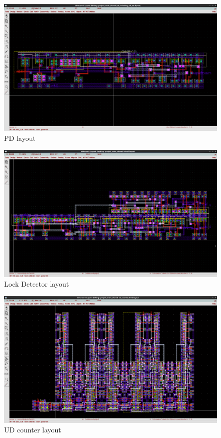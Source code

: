 \documentclass[a4paper,12pt]{article} \usepackage{graphicx}
\begin{document}
\begin{figure}[h]
  \centering
  \includegraphics[width=1.0\textwidth]{../Bilder/Layout/pd_including_clk_set.png}
  \caption{PD layout}
  \label{fig:LD}
\end{figure}

\begin{figure}[h]
  \centering
  \includegraphics[width=1.0\textwidth]{../Bilder/Layout/bitcell.png}
  \caption{Lock Detector layout}
  \label{fig:LD}
\end{figure}

\begin{figure}[h]
  \centering
  \includegraphics[width=1.0\textwidth]{../Bilder/Layout/ud_counter_6bit.png}
  \caption{UD counter layout}
  \label{fig:LD}
\end{figure}
\end{document}
